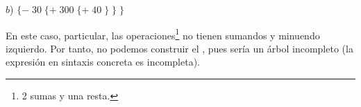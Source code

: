 \vspace*{0.3cm}
$b$) $\{-\; 30\; \{+\; 300\; \{+\; 40\; \}\; \}\; \}$

\hspace*{0.3cm} En este caso, particular, las operaciones\footnote{2 sumas y una resta.}
no tienen sumandos y minuendo izquierdo. Por tanto, no podemos construir el ,
pues sería un árbol incompleto (la expresión en sintaxis concreta es incompleta).


